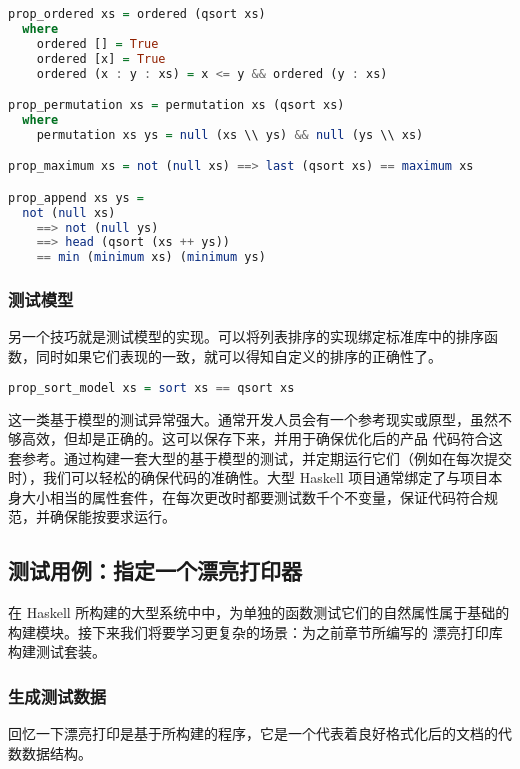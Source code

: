 \documentclass[./main.tex]{subfiles}
\begin{document}
\begin{lstlisting}[language=Haskell]
  prop_ordered xs = ordered (qsort xs)
  where
    ordered [] = True
    ordered [x] = True
    ordered (x : y : xs) = x <= y && ordered (y : xs)

prop_permutation xs = permutation xs (qsort xs)
  where
    permutation xs ys = null (xs \\ ys) && null (ys \\ xs)

prop_maximum xs = not (null xs) ==> last (qsort xs) == maximum xs

prop_append xs ys =
  not (null xs)
    ==> not (null ys)
    ==> head (qsort (xs ++ ys))
    == min (minimum xs) (minimum ys)
\end{lstlisting}

\subsubsection*{测试模型}

另一个技巧就是测试模型的实现。可以将列表排序的实现绑定标准库中的排序函数，同时如果它们表现的一致，就可以得知自定义的排序的正确性了。

\begin{lstlisting}[language=Haskell]
  prop_sort_model xs = sort xs == qsort xs
\end{lstlisting}

这一类基于模型的测试异常强大。通常开发人员会有一个参考现实或原型，虽然不够高效，但却是正确的。这可以保存下来，并用于确保优化后的产品
代码符合这套参考。通过构建一套大型的基于模型的测试，并定期运行它们（例如在每次提交时），我们可以轻松的确保代码的准确性。大型 Haskell
项目通常绑定了与项目本身大小相当的属性套件，在每次更改时都要测试数千个不变量，保证代码符合规范，并确保能按要求运行。

\subsection*{测试用例：指定一个漂亮打印器}

在 Haskell 所构建的大型系统中中，为单独的函数测试它们的自然属性属于基础的构建模块。接下来我们将要学习更复杂的场景：为之前章节所编写的
漂亮打印库构建测试套装。

\subsubsection*{生成测试数据}

回忆一下漂亮打印是基于所构建的程序，它是一个代表着良好格式化后的文档的代数数据结构。
\end{document}

